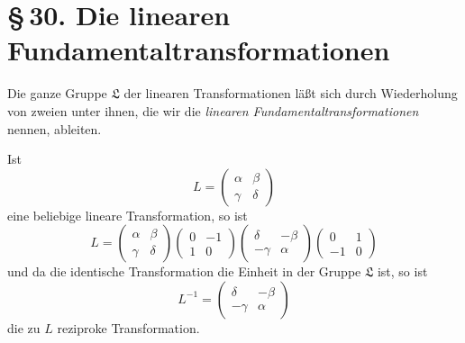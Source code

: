 \documentclass[12pt,a4paper]{article}
\begin{document}
\section{\S\,30. Die linearen Fundamentaltransformationen}

Die ganze Gruppe $\mathfrak{L}$ der linearen Transformationen l\"a\ss t sich durch Wiederholung von zweien unter ihnen, die wir die \emph{linearen Fundamentaltransformationen} nennen, ableiten.

Ist
\[
L = \begin{pmatrix} \alpha & \beta \\ \gamma & \delta \end{pmatrix}
\]
eine beliebige lineare Transformation, so ist
\[
L = \begin{pmatrix} \alpha & \beta \\ \gamma & \delta \end{pmatrix}\begin{pmatrix} 0 & -1 \\ 1 & 0 \end{pmatrix}\begin{pmatrix} \delta & -\beta \\ -\gamma & \alpha \end{pmatrix}\begin{pmatrix} 0 & 1 \\ -1 & 0 \end{pmatrix}
\]
und da die identische Transformation die Einheit in der Gruppe $\mathfrak{L}$ ist, so ist
\begin{equation}\label{eq:30_1}
L^{-1} = \begin{pmatrix} \delta & -\beta \\ -\gamma & \alpha \end{pmatrix}
\end{equation}
die zu $L$ reziproke Transformation.
\end{document}
